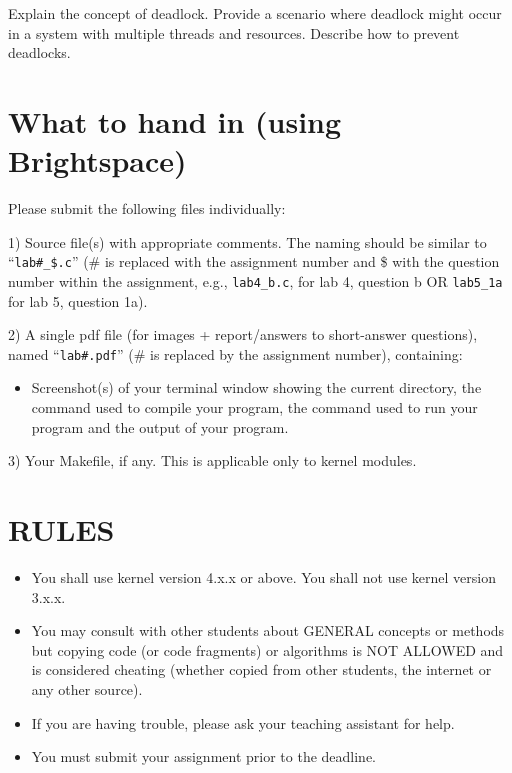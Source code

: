 \documentclass{article}
\begin{document}
Explain the concept of deadlock. Provide a scenario where deadlock might occur in a system with multiple threads and resources.  Describe how to prevent deadlocks.


\section*{What to hand in (using Brightspace)}

Please submit the following files individually:

1) Source file(s) with appropriate comments. The naming should be similar to “\texttt{lab\#\_\$.c}” (\# is replaced with the assignment number and \$ with the question number within the assignment, e.g., \texttt{lab4\_b.c}, for lab 4, question b OR \texttt{lab5\_1a} for lab 5, question 1a).

2) A single pdf file (for images + report/answers to short-answer questions), named “\texttt{lab\#.pdf}” (\# is replaced by the assignment number), containing:
    \begin{itemize}
        \item Screenshot(s) of your terminal window showing the current directory, the command used to compile your program, the command used to run your program and the output of your program.
    \end{itemize}
3) Your Makefile, if any. This is applicable only to kernel modules.


\section*{RULES}

\begin{itemize}
    \item You shall use kernel version 4.x.x or above. You shall not use kernel version 3.x.x.
    \item You may consult with other students about GENERAL concepts or methods but copying code (or code fragments) or algorithms is NOT ALLOWED and is considered cheating (whether copied from other students, the internet or any other source).
    \item If you are having trouble, please ask your teaching assistant for help.
    \item You must submit your assignment prior to the deadline.
\end{itemize}
\end{document}
